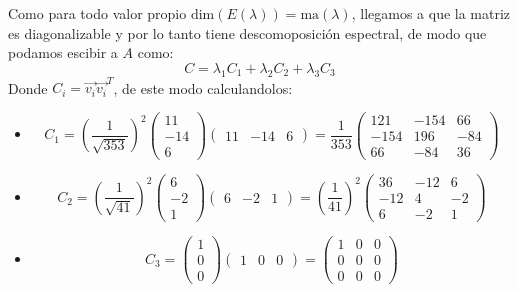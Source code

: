 \begin{itemize}
\begin{itemize}
        
    \end{itemize}
    Como para todo valor propio $\text{dim}(E(\lambda))=\text{ma}(\lambda)$, llegamos a que la matriz es diagonalizable y por lo tanto tiene descomoposici\'on espectral, de modo que podamos escibir a $A$ como:
    \[C=\lambda_1C_1+\lambda_2C_2+\lambda_3C_3\]
    Donde $C_i=\vec{v_i}\vec{v_i}^T$, de este modo calculandolos:
    \begin{itemize}
        \item \[C_1=\left(\frac{1}{\sqrt{353}}\right)^2\begin{pmatrix}11\\-14\\6\end{pmatrix}\begin{pmatrix}11&-14&6\end{pmatrix}=\frac{1}{353}\begin{pmatrix}121&-154&66\\-154&196&-84\\66&-84&36\end{pmatrix}\]
        \item \[C_2=\left(\frac{1}{\sqrt{41}}\right)^2\begin{pmatrix}6\\-2\\1\end{pmatrix}\begin{pmatrix}6&-2&1\end{pmatrix}=\left(\frac{1}{{41}}\right)^2\begin{pmatrix}36&-12&6\\ -12&4&-2\\ 6&-2&1\end{pmatrix}\]
        \item \[C_3=\begin{pmatrix}1\\0\\0\end{pmatrix}\begin{pmatrix}1&0&0\end{pmatrix}=\begin{pmatrix}1&0&0\\0&0&0\\0&0&0\end{pmatrix}\]
        
    \end{itemize}
    

\end{itemize}
